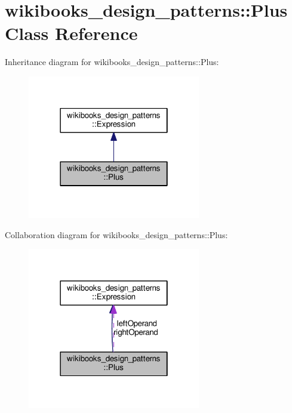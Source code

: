 \hypertarget{classwikibooks__design__patterns_1_1Plus}{}\section{wikibooks\+\_\+design\+\_\+patterns\+:\+:Plus Class Reference}
\label{classwikibooks__design__patterns_1_1Plus}


Inheritance diagram for wikibooks\+\_\+design\+\_\+patterns\+:\+:Plus\+:
\nopagebreak
\begin{figure}[H]
\begin{center}
\leavevmode
\includegraphics[width=214pt]{classwikibooks__design__patterns_1_1Plus__inherit__graph}
\end{center}
\end{figure}


Collaboration diagram for wikibooks\+\_\+design\+\_\+patterns\+:\+:Plus\+:
\nopagebreak
\begin{figure}[H]
\begin{center}
\leavevmode
\includegraphics[width=214pt]{classwikibooks__design__patterns_1_1Plus__coll__graph}
\end{center}
\end{figure}

